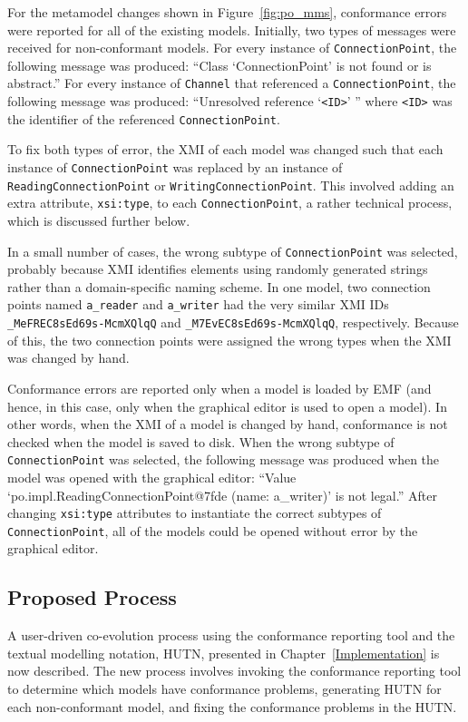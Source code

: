 For the metamodel changes shown in Figure~\ref{fig:po_mms}, conformance errors were reported for all of the existing models. Initially, two types of messages were received for non-conformant models. For every instance of \texttt{Co\-nn\-ec\-ti\-o\-nPo\-i\-nt}, the following message was produced: ``Class `ConnectionPoint' is not found or is abstract.'' For every instance of \texttt{Ch\-an\-n\-el} that referenced a \texttt{Co\-nn\-ec\-ti\-o\-nPo\-i\-nt}, the following message was produced: ``Unresolved reference `\texttt{<ID>}' '' where \texttt{<ID>} was the identifier of the referenced \texttt{Co\-nn\-ec\-ti\-o\-nPo\-i\-nt}.

To fix both types of error, the XMI of each model was changed such that each instance of \texttt{Co\-nn\-ec\-ti\-onPo\-in\-t} was replaced by an instance of \texttt{Re\-ad\-i\-ngCo\-nn\-ec\-ti\-o\-nPo\-i\-nt} or \texttt{Wr\-i\-ti\-ngCo\-nn\-ec\-ti\-o\-nPo\-i\-nt}. This involved adding an extra attribute, \texttt{xsi:type}, to each \texttt{Co\-nn\-ec\-ti\-onPo\-in\-t}, a rather technical process, which is discussed further below.

In a small number of cases, the wrong subtype of \texttt{Co\-nn\-ec\-ti\-onPo\-in\-t} was selected, probably because XMI identifies elements using randomly generated strings rather than a domain-specific naming scheme. In one model, two connection points named \texttt{a\_reader} and \texttt{a\_writer} had the very similar XMI IDs \texttt{\_MeFREC8sEd69s-McmXQlqQ} and \texttt{\_M7EvEC8sEd69s-McmXQlqQ}, respectively. Because of this, the two connection points were assigned the wrong types when the XMI was changed by hand.

Conformance errors are reported only when a model is loaded by EMF (and hence, in this case, only when the graphical editor is used to open a model). In other words, when the XMI of a model is changed by hand, conformance is not checked when the model is saved to disk. When the wrong subtype of  \texttt{Co\-nn\-ec\-ti\-onPo\-in\-t} was selected, the following message was produced when the model was opened with the graphical editor: ``Value `po.im\-pl.Re\-ad\-i\-ngCo\-nn\-ec\-ti\-onPo\-i\-nt@7f\-de (name: a\_writer)' is not legal.'' After changing \texttt{xsi:type} attributes to instantiate the correct subtypes of \texttt{Co\-nn\-ec\-ti\-onPo\-in\-t}, all of the models could be opened without error by the graphical editor.


\subsection{Proposed Process}
A user-driven co-evolution process using the conformance reporting tool and the textual modelling notation, HUTN, presented in Chapter~\ref{Implementation} is now described. The new process involves invoking the conformance reporting tool to determine which models have conformance problems, generating HUTN for each non-conformant model, and fixing the conformance problems in the HUTN.

